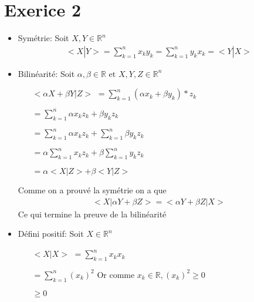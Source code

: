 \documentclass{article}
\author{Frederic Becerril}
\begin{document}
\part*{Exerice 2}

\begin{itemize}
    \item Symétrie: Soit $X, Y \in \mathbb{R}^n$\\
    \begin{align*}
        <X|Y> = \sum_{k=1}^n x_k y_k = \sum_{k=1}^n y_k x_k = <Y | X>
    \end{align*}
    \item Bilinéarité: Soit $\alpha, \beta \in \mathbb{R} \mbox{ et } X, Y, Z \in \mathbb{R}^n$
    \begin{center}
        \begin{minipage}{0.50\textwidth}    
            \begin{itemize}
                \item[$ <\alpha X + \beta Y | Z>$] $= \sum_{k=1}^n (\alpha x_k + \beta y_k) * z_k$
                \item[] $= \sum_{k=1}^n \alpha x_k z_k + \beta y_k z_k$
                \item[] $= \sum_{k=1}^n \alpha x_k z_k + \sum_{k=1}^n \beta y_k z_k$
                \item[] $= \alpha \sum_{k=1}^n x_k z_k + \beta \sum_{k=1}^n y_k z_k$
                \item[] $= \alpha <X | Z> + \beta <Y | Z> $
            \end{itemize}
        \end{minipage}
    \end{center}
    Comme on a prouvé la symétrie on a que
    \begin{align*}
        <X | \alpha Y + \beta Z> = <\alpha Y + \beta Z | X>
    \end{align*}
    Ce qui termine la preuve de la bilinéarité
    \item Défini positif: Soit $X \in \mathbb{R}^n$
    \begin{center}
        \begin{minipage}{0.50\textwidth}    
            \begin{itemize}
                \item[$<X | X>$] $=\sum_{k=1}^n x_k x_k$
                \item[] $= \sum_{k=1}^n (x_k)^2$ Or comme $x_k \in \mathbb{R}, (x_k)^2 \geq 0$
                \item[] $\geq 0$

\end{itemize}
\end{minipage}
\end{center}
\end{itemize}
\end{document}
